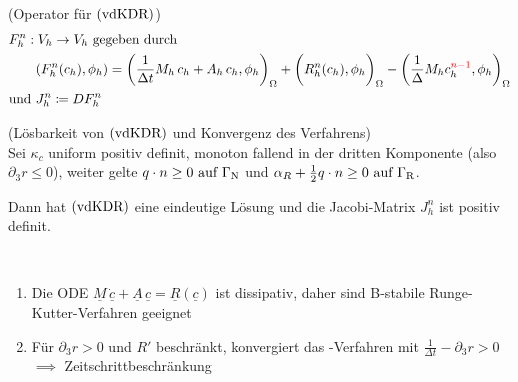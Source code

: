 \begin{define}(Operator für $ \operatorname{(vdKDR)} $)
	\begin{align*}
		&F_h^n: V_h \to V_h \text{ gegeben durch }\\ & \qquad (F_h^n(c_h), \phi_h) = \bigg( \frac{1}{\Delta t} M_h \, c_h + A_h \, c_h, \phi_h  \bigg)_\Omega + \bigg( R_h^n(c_h), \phi_h \bigg)_\Omega - \bigg( \frac{1}{\Delta} M_h c_h^{\textcolor{red}{n-1}}, \phi_h \bigg)_\Omega \\
		&\text{und } J_h^n \coloneqq D F_h^n
	\end{align*} 
\end{define}

\begin{Satz}(Lösbarkeit von $ \operatorname{(vdKDR)} $ und Konvergenz des Verfahrens)\\
	Sei $ \kappa_c $ uniform positiv definit, monoton fallend in der dritten Komponente (also $ \partial_3 r \le 0 $), weiter gelte $ q \cdot n \ge 0 \text{ auf } \Gamma_{\text{N}} $ und $ \alpha_R + \frac{1}{2} q \cdot n \ge 0 \text{ auf } \Gamma_{\text{R}} $.
	
	Dann hat $ \operatorname{(vdKDR)} $ eine eindeutige Lösung und die Jacobi-Matrix $ J_h^n $ ist positiv definit.
	
\end{Satz}

\begin{remark}\
	\begin{enumerate}
		\item Die ODE $\underline{M} \, \underline{\dot{c}} + \underline{A} \, \underline{c} = \underline{R}(\underline{c})$ ist dissipativ, daher sind B-stabile Runge-Kutter-Verfahren geeignet
		\item Für $ \partial_3 r > 0 $ und $ R' $ beschränkt, konvergiert das \unklar{Newton}-Verfahren mit $ \frac{1}{\Delta t} - \partial_3 r >0$ $ \implies$ Zeitschrittbeschränkung
	\end{enumerate}
\end{remark}

